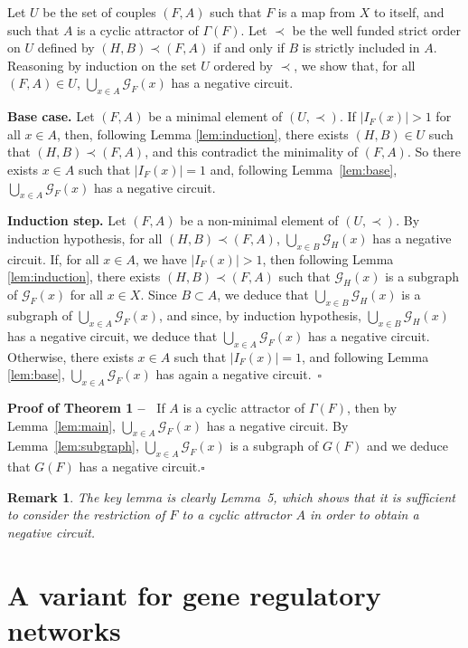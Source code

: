 \documentclass[11pt]{article}
\newtheorem{remark}{Remark}
\def\proof{\noindent{\bf Proof --~}}
\def\cqfd{\hfill$\square$}
\def\G{\mathscr{G}}
\begin{document}
\proof
Let $U$ be the set of couples $(F,A)$ such that $F$ is a map from $X$
to itself, and such that $A$ is a cyclic attractor of $\Gamma(F)$. Let
$\prec$ be the well funded strict order on $U$ defined by
$(H,B)\prec(F,A)$ if and only if $B$ is strictly included in
$A$. Reasoning by induction on the set $U$ ordered by $\prec$, we show
that, for all $(F,A)\in U$, $\bigcup_{x\in A} \G_F(x)$ has a negative
circuit.\bigskip

\noindent
{\bf Base case.} Let $(F,A)$ be a minimal element of $(U,\prec)$. If
$|I_F(x)|>1$ for all $x\in A$, then, following Lemma
{\ref{lem:induction}}, there exists $(H,B)\in U$ such that $(H,B)\prec
(F,A)$, and this contradict the minimality of $(F,A)$. So there exists
$x\in A$ such that $|I_F(x)|=1$ and, following Lemma~{\ref{lem:base}},
$\bigcup_{x\in A} \G_F(x)$ has a negative circuit.\bigskip

\noindent
{\bf Induction step.} Let $(F,A)$ be a non-minimal element of
$(U,\prec)$. By induction hypothesis, for all $(H,B)\prec (F,A)$,
$\bigcup_{x\in B} \G_H(x)$ has a negative circuit. If, for all $x\in
A$, we have $|I_F(x)|> 1$, then following Lemma {\ref{lem:induction}},
there exists $(H,B)\prec (F,A)$ such that $\G_H(x)$ is a subgraph of
$\G_F(x)$ for all $x\in X$. Since $B\subset A$, we deduce that
$\bigcup_{x\in B}\G_H(x)$ is a subgraph of $\bigcup_{x\in A} \G_F(x)$,
and since, by induction hypothesis, $\bigcup_{x\in B}\G_H(x)$ has a
negative circuit, we deduce that $\bigcup_{x\in A} \G_F(x)$ has a
negative circuit. Otherwise, there exists $x\in A$ such that
$|I_F(x)|=1$, and following Lemma {\ref{lem:base}}, $\bigcup_{x\in A}
\G_F(x)$ has again a negative circuit.~\cqfd\bigskip


\noindent
{\bf Proof of Theorem 1 --~} If $A$ is a cyclic attractor of
$\Gamma(F)$, then by Lemma~{\ref{lem:main}}, $\bigcup_{x\in A}\G_F(x)$
has a negative circuit. By Lemma~{\ref{lem:subgraph}}, $\bigcup_{x\in
A}\G_F(x)$ is a subgraph of $G(F)$ and we deduce that $G(F)$ has a
negative circuit.\cqfd


\begin{remark}
{\emph{The key lemma is clearly Lemma~5, which shows that it is
sufficient to consider the restriction of $F$ to a cyclic attractor
$A$ in order to obtain a negative circuit.}}
\end{remark}


\section{A variant for gene regulatory networks}
\end{document}
